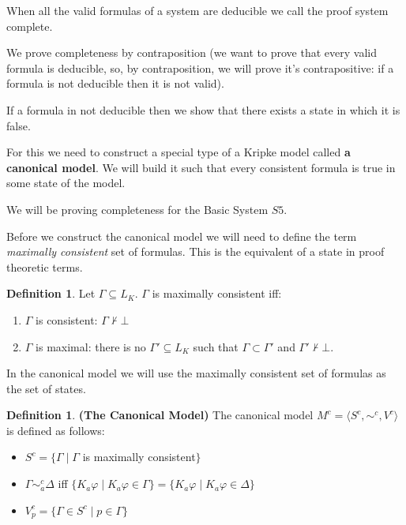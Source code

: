 \documentclass[12pt]{article}
\numberwithin{equation}{section}
\theoremstyle{definition}
\theoremstyle{definition}
\newtheorem{defn}[thm]{Definition}
\theoremstyle{remark}
\begin{document}
When all the valid formulas of a system are deducible we call the proof system complete.

We prove completeness by contraposition (we want to prove that every valid formula is deducible, so, by contraposition, we will prove it's contrapositive: if a formula is not deducible then it is not valid).

If a formula in not deducible then we show that there exists a state in which it is false.

For this we need to construct a special type of a Kripke model called \textbf{a canonical model}. We will build it such that every consistent formula is true in some state of the model.

We will be proving completeness for the Basic System $S5$.

Before we construct the canonical model we will need to define the term \textit{maximally consistent} set of formulas. This is the equivalent of a state in proof theoretic terms.

\begin{defn}

Let $\Gamma \subseteq L_K$. $\Gamma$ is maximally consistent iff:
\begin{enumerate}
    \item $\Gamma$ is consistent: $ \Gamma \nvdash \bot$
    \item $\Gamma$ is maximal: there is no $\Gamma' \subseteq L_K$ such that $\Gamma \subset \Gamma'$ and $\Gamma' \nvdash \bot$.
\end{enumerate}

\end{defn}

   


In the canonical model we will use the maximally consistent set of formulas as the set of states. 

\begin{defn}

\textbf{(The Canonical Model)}
The canonical model $M^c = \langle S^c, \sim ^c, V^c \rangle$ is defined as follows:

\begin{itemize}
    \item  $S^c = \{ \Gamma \mid \Gamma$ is maximally consistent$\}$
    \item $\Gamma \sim _a ^ c \Delta$ iff $\{ K_a\varphi \mid K_a\varphi \in \Gamma \} = \{ K_a\varphi \mid K_a\varphi \in \Delta \}$
    \item $V_p^c = \{ \Gamma \in S^c \mid p \in \Gamma \}$
\end{itemize}

\end{defn}
\end{document}
